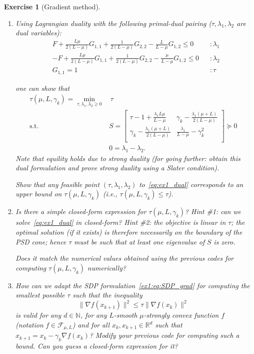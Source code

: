 \documentclass[11pt,a4paper]{article}
\newtheorem{exercise}{Exercise}
\begin{document}
\begin{exercise}[Gradient method]
\begin{enumerate}
	\item Using Lagrangian duality with the following primal-dual pairing ($\tau,\lambda_1,\lambda_2$ are dual variables):
	\begin{equation*}
			\begin{aligned}
			& F + \tfrac{L\mu}{2(L-\mu)} G_{1,1}+\tfrac{1}{2(L-\mu)}G_{2,2}-\tfrac{L}{L-\mu}G_{1,2}\leqslant 0&&:\lambda_1\\
			&-F + \tfrac{L\mu}{2(L-\mu)} G_{1,1}+\tfrac{1}{2(L-\mu)}G_{2,2}-\tfrac{\mu}{L-\mu}G_{1,2}\leqslant 0&&:\lambda_2\\
			&G_{1,1}= 1&&:\tau
			\end{aligned}
			\end{equation*}
	
	 one can show that
		\begin{equation}\label{eq:ex1_dual}	 
		\begin{aligned}
			\tau(\mu,L,\gamma_k)=\min_{\tau,\lambda_1,\lambda_2\geqslant 0} & \,\tau\\
			\text{s.t. }& S=\begin{bmatrix}
				\tau-1+\frac{\lambda_1 L\mu}{L-\mu } & \gamma_k-\frac{\lambda_1 (\mu +L)}{2 (L-\mu )} \\
				\gamma_k-\frac{\lambda_1 (\mu +L)}{2 (L-\mu )} & \frac{\lambda_1}{L-\mu }-\gamma_k^2 \\
			\end{bmatrix}\succcurlyeq 0\\
			&0=\lambda_1-\lambda_2.
		\end{aligned}
		\end{equation}
	Note that equility holds due to strong duality (for going further: obtain this dual formulation and prove strong duality using a Slater condition). 
	
	Show that any feasible point $(\tau,\lambda_1,\lambda_2)$ to~\eqref{eq:ex1_dual} corresponds to an upper bound on $\tau(\mu,L,\gamma_k)$ (i.e., $\tau(\mu,L,\gamma_k)\leqslant \tau$).
	
	\item Is there a simple closed-form expression for $\tau(\mu,L,\gamma_k)$? Hint \#1: can we solve~\eqref{eq:ex1_dual} in closed-form? Hint \#2: the objective is linear in $\tau$; the optimal solution (if it exists) is therefore necessarily on the boundary of the PSD cone; hence $\tau$ must be such that at least one eigenvalue of $S$ is zero.
	
	Does it match the numerical values obtained using the previous codes for computing $\tau(\mu,L,\gamma_k)$ numerically?
	\item How can we adapt the SDP formulation~\eqref{ex1:eq:SDP_grad} for computing the smallest possible $\tau$ such that the inequality
	\[ \|\nabla f(x_{k+1})\|^2 \leqslant \tau \|\nabla f(x_k)\|^2\]
	is valid for any $d\in\mathbb{N}$, for any $L$-smooth $\mu$-strongly convex function $f$ (notation $f\in\mathcal{F}_{\mu,L}$) and for all $x_k,x_{k+1}\in\mathbb{R}^d$ such that $x_{k+1}=x_k-\gamma_k \nabla f(x_k)$? Modify your previous code for computing such a bound. Can you guess a closed-form expression for it?
	

\end{enumerate}
\end{exercise}
\end{document}
